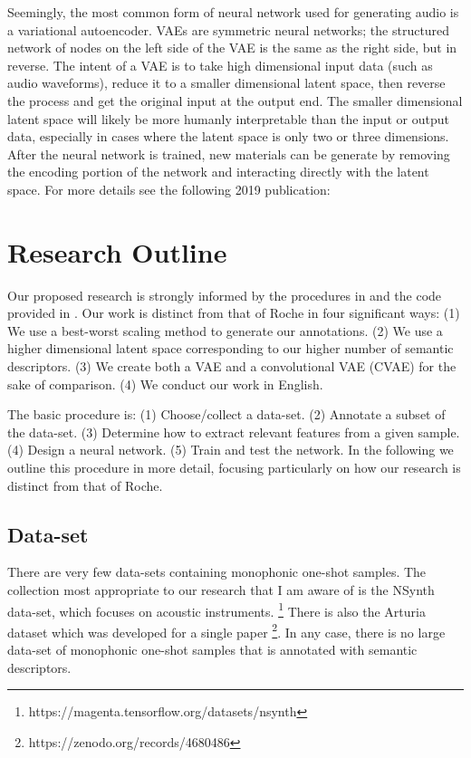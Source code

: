 \documentclass{article}
\begin{document}
Seemingly, the most common form of neural network used for generating audio is a variational autoencoder. VAEs are symmetric neural networks; the structured network of nodes on the left side of the VAE is the same as the right side, but in reverse. The intent of a VAE is to take high dimensional input data (such as audio waveforms), reduce it to a smaller dimensional latent space, then reverse the process and get the original input at the output end. The smaller dimensional latent space will likely be more humanly interpretable than the input or output data, especially in cases where the latent space is only two or three dimensions. After the neural network is trained, new materials can be generate by removing the encoding portion of the network and interacting directly with the latent space. For more details see the following 2019 publication: \cite{Kingma2019}


\section{Research Outline}

Our proposed research is strongly informed by the procedures in \cite{Roche2020} and the code provided in \cite{Esling2018}. Our work is distinct from that of Roche in four significant ways: (1) We use a best-worst scaling method to generate our annotations. (2) We use a higher dimensional latent space corresponding to our higher number of semantic descriptors. (3) We create both a VAE and a convolutional VAE (CVAE) for the sake of comparison. (4) We conduct our work in English.

The basic procedure is: (1) Choose/collect a data-set. (2) Annotate a subset of the data-set. (3) Determine how to extract relevant features from a given sample. (4) Design a neural network. (5) Train and test the network. In the following we outline this procedure in more detail, focusing particularly on how our research is distinct from that of Roche.


\subsection{Data-set}
There are very few data-sets containing monophonic one-shot samples. The collection most appropriate to our research that I am aware of is the NSynth data-set, which focuses on acoustic instruments. \cite{Engel2017}\footnote{https://magenta.tensorflow.org/datasets/nsynth} There is also the Arturia dataset which was developed for a single paper \cite{Roche2021}\footnote{https://zenodo.org/records/4680486}. In any case, there is no large data-set of monophonic one-shot samples that is annotated with semantic descriptors.
\end{document}
